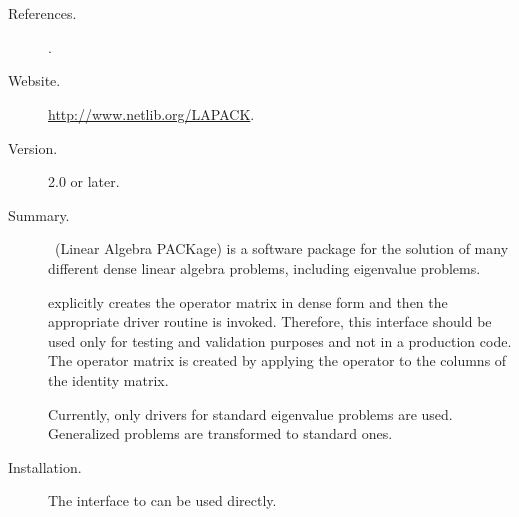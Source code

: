 \section*{\underline{\lapack}}
	\begin{description}
	\item[References.]\citep{Anderson:1992:LUG}.
	\item[Website.] \url{http://www.netlib.org/LAPACK}.
	\item[Version.] 2.0 or later.
	\item[Summary.] \lapack\ (Linear Algebra PACKage) is a software package for the solution of many different dense linear algebra problems, including eigenvalue problems.

	\slepc explicitly creates the operator matrix in dense form and then the appropriate \lapack{} driver routine is invoked. Therefore, this interface should be used only for testing and validation purposes and not in a production code. The operator matrix is created by applying the operator to the columns of the identity matrix.

	Currently, only \lapack{} drivers for standard eigenvalue problems are
used. Generalized problems are transformed to standard ones.
	
	\item[Installation.]
	The \slepc interface to \lapack{} can be used directly.
	\end{description}

